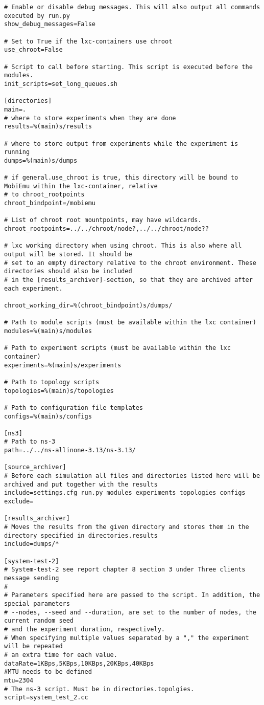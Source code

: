 \begin{lstlisting}[frame=single, caption={Setting.cfg}, label=mobiemu:setting.cfg, breaklines=true]
# Enable or disable debug messages. This will also output all commands executed by run.py
show_debug_messages=False

# Set to True if the lxc-containers use chroot
use_chroot=False

# Script to call before starting. This script is executed before the modules.
init_scripts=set_long_queues.sh

[directories]
main=.
# where to store experiments when they are done
results=%(main)s/results

# where to store output from experiments while the experiment is running
dumps=%(main)s/dumps

# if general.use_chroot is true, this directory will be bound to MobiEmu within the lxc-container, relative
# to chroot_rootpoints
chroot_bindpoint=/mobiemu

# List of chroot root mountpoints, may have wildcards.
chroot_rootpoints=../../chroot/node?,../../chroot/node??

# lxc working directory when using chroot. This is also where all output will be stored. It should be
# set to an empty directory relative to the chroot environment. These directories should also be included
# in the [results_archiver]-section, so that they are archived after each experiment.

chroot_working_dir=%(chroot_bindpoint)s/dumps/

# Path to module scripts (must be available within the lxc container)
modules=%(main)s/modules

# Path to experiment scripts (must be available within the lxc container)
experiments=%(main)s/experiments

# Path to topology scripts
topologies=%(main)s/topologies

# Path to configuration file templates
configs=%(main)s/configs

[ns3]
# Path to ns-3
path=../../ns-allinone-3.13/ns-3.13/

[source_archiver]
# Before each simulation all files and directories listed here will be archived and put together with the results
include=settings.cfg run.py modules experiments topologies configs
exclude=

[results_archiver]
# Moves the results from the given directory and stores them in the directory specified in directories.results
include=dumps/*

[system-test-2]
# System-test-2 see report chapter 8 section 3 under Three clients message sending
#
# Parameters specified here are passed to the script. In addition, the special parameters
# --nodes, --seed and --duration, are set to the number of nodes, the current random seed
# and the experiment duration, respectively.
# When specifying multiple values separated by a "," the experiment will be repeated
# an extra time for each value.
dataRate=1KBps,5KBps,10KBps,20KBps,40KBps
#MTU needs to be defined
mtu=2304
# The ns-3 script. Must be in directories.topolgies.
script=system_test_2.cc


\end{lstlisting}
